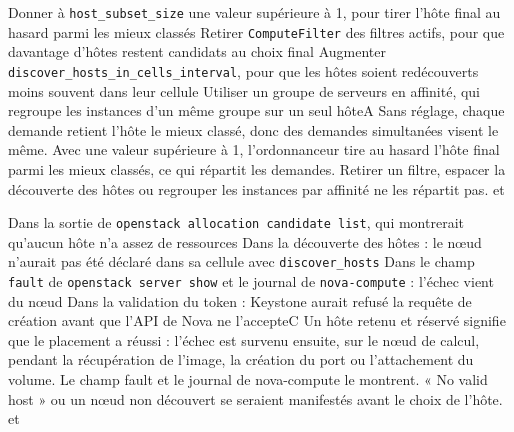   {Donner à \texttt{host\_subset\_size} une valeur supérieure à 1, pour tirer l'hôte final au hasard parmi les mieux classés}
  {Retirer \texttt{ComputeFilter} des filtres actifs, pour que davantage d'hôtes restent candidats au choix final}
  {Augmenter \texttt{discover\_hosts\_in\_cells\_interval}, pour que les hôtes soient redécouverts moins souvent dans leur cellule}
  {Utiliser un groupe de serveurs en affinité, qui regroupe les instances d'un même groupe sur un seul hôte}{A}
  {Sans réglage, chaque demande retient l'hôte le mieux classé, donc des demandes simultanées visent le même. Avec une valeur supérieure à 1, l'ordonnanceur tire au hasard l'hôte final parmi les mieux classés, ce qui répartit les demandes. Retirer un filtre, espacer la découverte des hôtes ou regrouper les instances par affinité ne les répartit pas.}
  { et }

  {Dans la sortie de \texttt{openstack allocation candidate list}, qui montrerait qu'aucun hôte n'a assez de ressources}
  {Dans la découverte des hôtes : le nœud n'aurait pas été déclaré dans sa cellule avec \texttt{discover\_hosts}}
  {Dans le champ \texttt{fault} de \texttt{openstack server show} et le journal de \texttt{nova-compute} : l'échec vient du nœud}
  {Dans la validation du token : Keystone aurait refusé la requête de création avant que l'API de Nova ne l'accepte}{C}
  {Un hôte retenu et réservé signifie que le placement a réussi : l'échec est survenu ensuite, sur le nœud de calcul, pendant la récupération de l'image, la création du port ou l'attachement du volume. Le champ fault et le journal de nova-compute le montrent. « No valid host » ou un nœud non découvert se seraient manifestés avant le choix de l'hôte.}
  { et }

